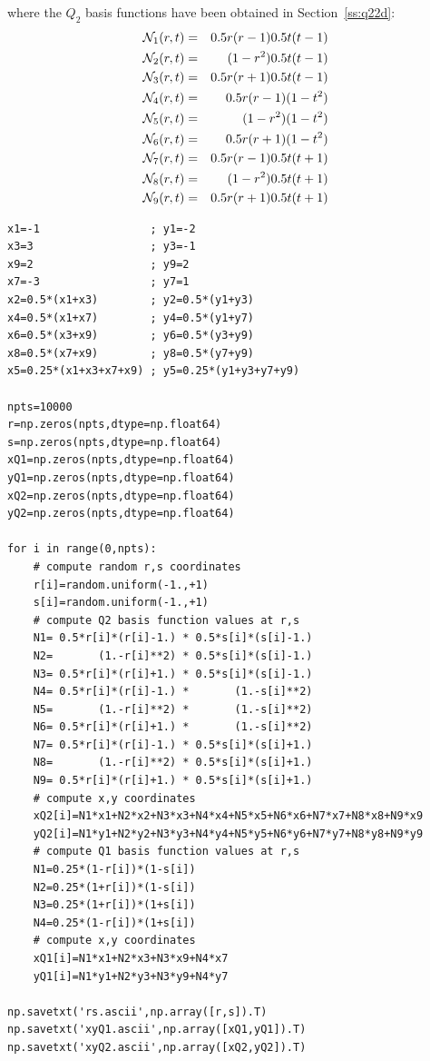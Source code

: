 where the $Q_2$ basis functions have been obtained in Section~\ref{ss:q22d}:
\begin{eqnarray}
{\mathcal{N}}_1(r,t)&=& 0.5r(r-1)  0.5t(t-1) \nonumber\\
{\mathcal{N}}_2(r,t)&=&      (1-r^2)  0.5t(t-1) \nonumber\\
{\mathcal{N}}_3(r,t)&=& 0.5r(r+1)  0.5t(t-1) \nonumber\\
{\mathcal{N}}_4(r,t)&=& 0.5r(r-1)       (1-t^2) \nonumber\\
{\mathcal{N}}_5(r,t)&=&      (1-r^2)       (1-t^2) \nonumber\\
{\mathcal{N}}_6(r,t)&=& 0.5r(r+1)       (1-t^2) \nonumber\\
{\mathcal{N}}_7(r,t)&=& 0.5r(r-1)  0.5t(t+1) \nonumber\\
{\mathcal{N}}_8(r,t)&=&      (1-r^2)  0.5t(t+1) \nonumber\\
{\mathcal{N}}_9(r,t)&=& 0.5r(r+1)  0.5t(t+1) \nonumber
\end{eqnarray}


\begin{lstlisting}
x1=-1                 ; y1=-2
x3=3                  ; y3=-1
x9=2                  ; y9=2
x7=-3                 ; y7=1
x2=0.5*(x1+x3)        ; y2=0.5*(y1+y3)
x4=0.5*(x1+x7)        ; y4=0.5*(y1+y7)
x6=0.5*(x3+x9)        ; y6=0.5*(y3+y9)
x8=0.5*(x7+x9)        ; y8=0.5*(y7+y9)
x5=0.25*(x1+x3+x7+x9) ; y5=0.25*(y1+y3+y7+y9)

npts=10000
r=np.zeros(npts,dtype=np.float64)   
s=np.zeros(npts,dtype=np.float64)   
xQ1=np.zeros(npts,dtype=np.float64)   
yQ1=np.zeros(npts,dtype=np.float64)   
xQ2=np.zeros(npts,dtype=np.float64)   
yQ2=np.zeros(npts,dtype=np.float64)   

for i in range(0,npts):
    # compute random r,s coordinates
    r[i]=random.uniform(-1.,+1)
    s[i]=random.uniform(-1.,+1)
    # compute Q2 basis function values at r,s
    N1= 0.5*r[i]*(r[i]-1.) * 0.5*s[i]*(s[i]-1.)
    N2=       (1.-r[i]**2) * 0.5*s[i]*(s[i]-1.)
    N3= 0.5*r[i]*(r[i]+1.) * 0.5*s[i]*(s[i]-1.)
    N4= 0.5*r[i]*(r[i]-1.) *       (1.-s[i]**2)
    N5=       (1.-r[i]**2) *       (1.-s[i]**2)
    N6= 0.5*r[i]*(r[i]+1.) *       (1.-s[i]**2)
    N7= 0.5*r[i]*(r[i]-1.) * 0.5*s[i]*(s[i]+1.)
    N8=       (1.-r[i]**2) * 0.5*s[i]*(s[i]+1.)
    N9= 0.5*r[i]*(r[i]+1.) * 0.5*s[i]*(s[i]+1.)
    # compute x,y coordinates
    xQ2[i]=N1*x1+N2*x2+N3*x3+N4*x4+N5*x5+N6*x6+N7*x7+N8*x8+N9*x9
    yQ2[i]=N1*y1+N2*y2+N3*y3+N4*y4+N5*y5+N6*y6+N7*y7+N8*y8+N9*y9
    # compute Q1 basis function values at r,s
    N1=0.25*(1-r[i])*(1-s[i])
    N2=0.25*(1+r[i])*(1-s[i])
    N3=0.25*(1+r[i])*(1+s[i])
    N4=0.25*(1-r[i])*(1+s[i])
    # compute x,y coordinates
    xQ1[i]=N1*x1+N2*x3+N3*x9+N4*x7
    yQ1[i]=N1*y1+N2*y3+N3*y9+N4*y7

np.savetxt('rs.ascii',np.array([r,s]).T)
np.savetxt('xyQ1.ascii',np.array([xQ1,yQ1]).T)
np.savetxt('xyQ2.ascii',np.array([xQ2,yQ2]).T)
\end{lstlisting}

